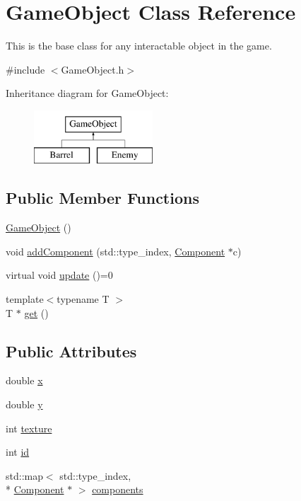 \hypertarget{classGameObject}{\section{Game\-Object Class Reference}
\label{classGameObject}
}


This is the base class for any interactable object in the game.  




{\ttfamily \#include $<$Game\-Object.\-h$>$}

Inheritance diagram for Game\-Object\-:\begin{figure}[H]
\begin{center}
\leavevmode
\includegraphics[height=2.000000cm]{classGameObject}
\end{center}
\end{figure}
\subsection*{Public Member Functions}
\begin{DoxyCompactItemize}
\item 
\hyperlink{classGameObject_a0348e3ee2e83d56eafca7a3547f432c4}{Game\-Object} ()
\item 
void \hyperlink{classGameObject_aec6d8e80fc3b484b5664630f2c33a19c}{add\-Component} (std\-::type\-\_\-index, \hyperlink{classComponent}{Component} $\ast$c)
\item 
virtual void \hyperlink{classGameObject_ae83128d0e0efef691417779605ee037c}{update} ()=0
\item 
{\footnotesize template$<$typename T $>$ }\\T $\ast$ \hyperlink{classGameObject_ac9ae1908800a5bb242a999ee76dd96b5}{get} ()
\end{DoxyCompactItemize}
\subsection*{Public Attributes}
\begin{DoxyCompactItemize}
\item 
double \hyperlink{classGameObject_a77ae10ff022a6cfe7419d4acdcffe2a4}{x}
\item 
double \hyperlink{classGameObject_af3f4a42c92fa6f6ac04d57bf4b11d43f}{y}
\item 
int \hyperlink{classGameObject_a1d4d998891f953e4a4f15d7372a0d9e3}{texture}
\item 
int \hyperlink{classGameObject_a98291c60da12d9036e1ad24cfebcf6b3}{id}
\item 
std\-::map$<$ std\-::type\-\_\-index, \\*
\hyperlink{classComponent}{Component} $\ast$ $>$ \hyperlink{classGameObject_a665551395d1403714708bedd897cc9a3}{components}
\end{DoxyCompactItemize}


